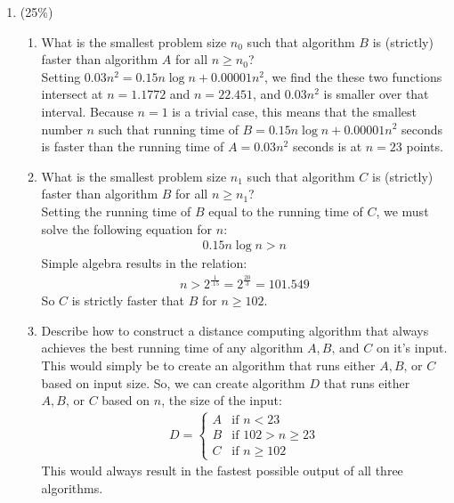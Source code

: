 \documentclass[11pt]{article}
\begin{document}
\begin{enumerate}
\item (25\%)
\begin{enumerate}
\item What is the smallest problem size $n_0$ such that algorithm $\mathit{B}$ is (strictly) faster than algorithm $\mathit{A}$
for all $n \geq n_0$?
\\
Setting $0.03n^2 = 0.15n \log n+0.00001n^2$, we find the these two functions intersect at $n=1.1772$ and $n=22.451$, and $0.03n^2$ is smaller over that interval.  Because $n=1$ is a trivial case, this means that the smallest number $n$ such that running time of $\mathit{B}=0.15n \log n+0.00001n^2$ seconds is faster than the running time of  $\mathit{A}= 0.03n^2$ seconds is at $n=23$ points.
\\
\item What is the smallest problem size $n_1$ such that algorithm $\mathit{C}$ is (strictly) faster than algorithm $\mathit{B}$ for all $n \geq n_1$?
\\
Setting the running time of $\mathit{B}$ equal to the running time of $\mathit{C}$, we must solve the following equation for $n$:
\begin{align*}
0.15n \log n > n
\end{align*}
Simple algebra results in the relation:
\begin{align*}
n > 2^{\frac{1}{.15}}= 2 ^{\frac{20}{3}} = 101.549
\end{align*}
So $\mathit{C}$ is strictly faster that $\mathit{B}$ for $n \geq 102$.
\item Describe how to construct a distance computing algorithm that always achieves the best running time of any algorithm $\mathit{A}, \mathit{B} \textrm{, and } \mathit{C}$ on it's input.
\\
This would simply be to create an algorithm that runs either $\mathit{A}, \mathit{B} \textrm{, or } \mathit{C}$ based on input size.  So, we can create algorithm $D$ that runs either  $\mathit{A}, \mathit{B} \textrm{, or } \mathit{C}$ based on $n$, the size of the input:
\begin{align*}
D = 	\begin{cases}
		A & \text{if } n < 23 \\
		B & \text{if } 102>n\geq 23 \\
		C & \text{if } n\geq 102
	\end{cases}
\end{align*}
This would always result in the fastest possible output of all three algorithms.

\end{enumerate}
\end{enumerate}
\end{document}
